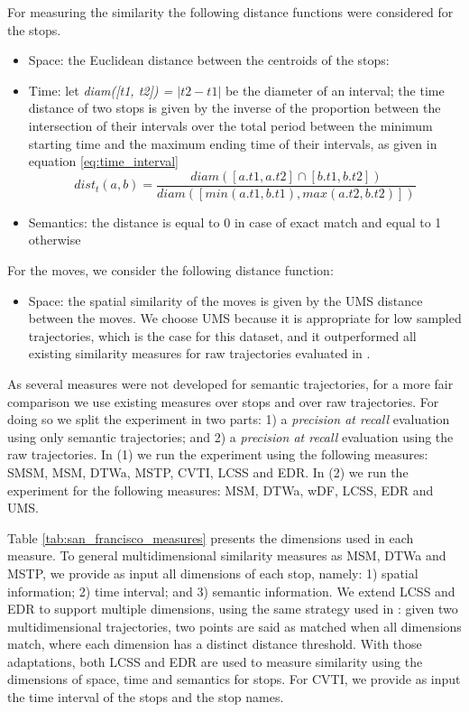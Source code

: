 \documentclass[12pt]{article}
\begin{document}
For measuring the similarity the following distance functions were considered for the stops.
\begin{itemize}
  \item Space: the Euclidean distance between the centroids of the stops:
	\item Time: let \textit{diam([t1, t2]) = $|t2 - t1|$} be the diameter of an interval; the time distance of two stops is given by the inverse of the proportion between the intersection of their intervals over the total period between the minimum starting time and the maximum ending time of their intervals, as given in equation \ref{eq:time_interval}
\begin{equation} \label{eq:time_interval}
	dist_t(a, b) = \dfrac{diam([a.t1, a.t2] \cap [b.t1, b.t2])}{diam([min(a.t1, b.t1), max(a.t2, b.t2)])}
\end{equation}
  \item Semantics: the distance is equal to 0 in case of exact match and equal to 1 otherwise
\end{itemize}

For the moves, we consider the following distance function:
\begin{itemize}
  \item Space: the spatial similarity of the moves is given by the UMS distance between the moves. We choose UMS because it is appropriate for low sampled trajectories, which is the case for this dataset, and it outperformed all existing similarity measures for raw trajectories evaluated in \cite{Furtado-UMS-2018}.
\end{itemize}

As several measures were not developed for semantic trajectories, for a more fair comparison we use existing measures over stops and over raw trajectories. For doing so we split the experiment in two parts: 1) a \textit{precision at recall} evaluation using only semantic trajectories; and 2) a \textit{precision at recall} evaluation using the raw trajectories. In (1) we run the experiment using the following measures: SMSM, MSM, DTWa, MSTP, CVTI, LCSS and EDR. In (2) we run the experiment for the following measures: MSM, DTWa, wDF, LCSS, EDR and UMS.

Table {\ref{tab:san_francisco_measures}} presents the dimensions used in each measure. To general multidimensional similarity measures as MSM, DTWa and MSTP, we provide as input all dimensions of each stop, namely: 1)  spatial information; 2) time interval; and 3) semantic information. We extend LCSS and EDR to support multiple dimensions, using the same strategy used in {\cite{Furtado:TGIS12156}}: given two multidimensional trajectories, two points are said as matched when all dimensions match, where each dimension has a distinct distance threshold. With those adaptations, both LCSS and EDR are used to measure similarity using the dimensions of space, time and semantics for stops. For CVTI, we provide as input the time interval of the stops and the stop names.
\end{document}
